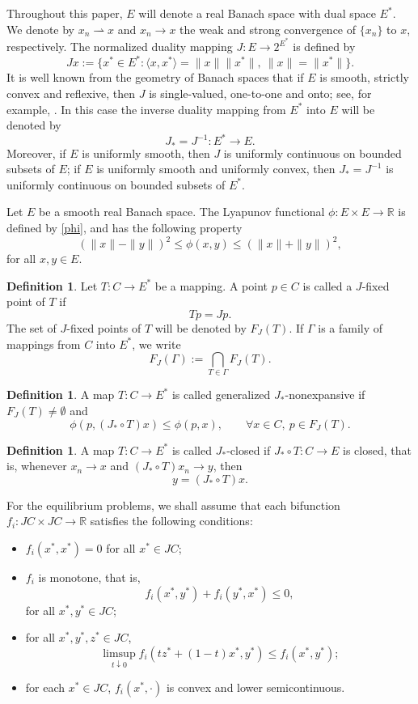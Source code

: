 \documentclass[leqno,12pt]{amsart}
\theoremstyle{definition}
\newtheorem{definition}[theorem]{Definition}
\numberwithin{equation}{section}
\begin{document}
Throughout this paper, $E$ will denote a real Banach space with dual space $E^{*}$. We denote by $x_n\rightharpoonup x$ and $x_n\to x$ the weak and strong convergence of $\{x_n\}$ to $x$, respectively. The normalized duality mapping $J:E\to 2^{E^{*}}$ is defined by
\[
Jx:=\{x^{*}\in E^{*}:\langle x,x^{*}\rangle=\|x\|\|x^{*}\|,\ \|x\|=\|x^{*}\|\}.
\]
It is well known from the geometry of Banach spaces that if $E$ is smooth, strictly convex and reflexive, then $J$ is single-valued, one-to-one and onto; see, for example, \cite{Cioranescu1990,Takahashi2000}. In this case the inverse duality mapping from $E^{*}$ into $E$ will be denoted by
\[
J_{*}=J^{-1}:E^{*}\to E.
\]
Moreover, if $E$ is uniformly smooth, then $J$ is uniformly continuous on bounded subsets of $E$; if $E$ is uniformly smooth and uniformly convex, then $J_{*}=J^{-1}$ is uniformly continuous on bounded subsets of $E^{*}$.

Let $E$ be a smooth real Banach space. The Lyapunov functional $\phi:E\times E\to\mathbb{R}$ is defined by \eqref{phi}, and has the following property
\begin{equation}\label{phibounds}
(\|x\|-\|y\|)^2\leq \phi(x,y)\leq (\|x\|+\|y\|)^2,
\end{equation}
for all $x,y\in E$.


\begin{definition}
Let $T:C\to E^{*}$ be a mapping. A point $p\in C$ is called a $J$-fixed point of $T$ if
\[
Tp=Jp.
\]
The set of $J$-fixed points of $T$ will be denoted by $F_J(T)$.
If $\Gamma$ is a family of mappings from $C$ into $E^{*}$, we write
\[
F_J(\Gamma):=\bigcap_{T\in \Gamma}F_J(T).
\]
\end{definition}

\begin{definition}
A map $T:C\to E^{*}$ is called generalized $J_{*}$-nonexpansive if $F_J(T)\neq\emptyset$ and
\[
\phi(p,(J_{*}\circ T)x)\leq \phi(p,x),\qquad \forall x\in C,\ p\in F_J(T).
\]
\end{definition}

\begin{definition}
A map $T:C\to E^{*}$ is called $J_{*}$-closed if $J_{*}\circ T:C\to E$ is closed, that is, whenever $x_n\to x$ and $(J_{*}\circ T)x_n\to y$, then
\[
y=(J_{*}\circ T)x.
\]
\end{definition}

For the equilibrium problems, we shall assume that each bifunction $f_i:JC\times JC\to\mathbb{R}$ satisfies the following conditions:
\begin{itemize}
\item[(A1)] $f_i(x^{*},x^{*})=0$ for all $x^{*}\in JC$;
\item[(A2)] $f_i$ is monotone, that is,
\[
f_i(x^{*},y^{*})+f_i(y^{*},x^{*})\leq 0,
\]
for all $x^{*},y^{*}\in JC$;
\item[(A3)] for all $x^{*},y^{*},z^{*}\in JC$,
\[
\limsup_{t\downarrow 0}f_i(tz^{*}+(1-t)x^{*},y^{*})\leq f_i(x^{*},y^{*});
\]
\item[(A4)] for each $x^{*}\in JC$, $f_i(x^{*},\cdot)$ is convex and lower semicontinuous.
\end{itemize}
\end{document}

